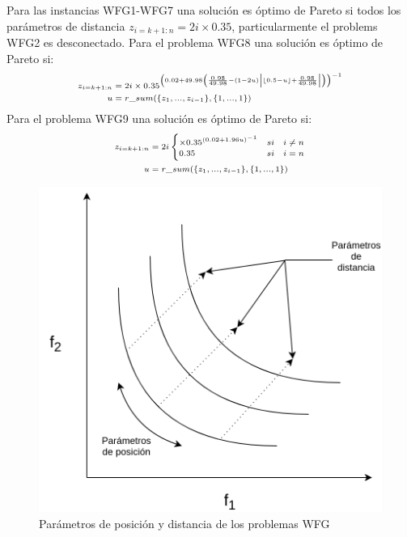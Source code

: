 Para las instancias WFG1-WFG7 una solución es óptimo de Pareto si todos los parámetros de distancia  $z_{i=k+1:n} = 2 i \times 0.35 $, particularmente el problems WFG2 es desconectado.
%
Para el problema WFG8 una solución es óptimo de Pareto si:
\begin{equation*}
\scriptsize
\begin{split}
z_{i=k+1:n} &= 2 i \times 0.35^{ \left  (   0.02 + 49.98  \left ( \frac{0.98}{49.98} - (1-2u) \left | \lfloor 0.5 - u \rfloor + \frac{0.98}{49.98} \right 	| \right  )            \right   )^{-1}    } \\
u &= r\_sum( \{ z_1, ..., z_{i-1} \}, \{ 1, ..., 1 \})
\end{split}
\end{equation*}  
Para el problema WFG9 una solución es óptimo de Pareto si:
\begin{equation*}
\scriptsize
\begin{split}
z_{i=k+1:n} &= 2 i  \begin{cases}\times 0.35^{  (0.02 + 1.96 u   )^{-1}    } & si \quad i \neq n \\ 0.35 & si \quad i=n \end{cases} \\
u &= r\_sum( \{ z_1, ..., z_{i-1} \}, \{ 1, ..., 1 \})
\end{split}
\end{equation*}

\begin{figure}[H]
\centering
\scriptsize
\includegraphics[scale=0.30]
{Figures_Chapter2/Parametros_Posicion_Distancia.png}
\caption{Par\'ametros de posici\'on y distancia de los problemas WFG}
\label{fig:ParametrosWFG}
\end{figure}



